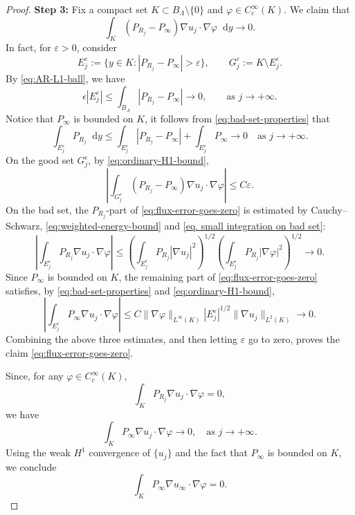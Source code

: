 \documentclass[12pt]{amsart}
\theoremstyle{plain}
\theoremstyle{definition}
\theoremstyle{remark}     %
\numberwithin{equation}{section}
\newcommand{\dd}{\mathop{}\!\mathrm{d}}%
\begin{document}
\begin{proof}
\noindent
{\bf Step 3:}
Fix a compact set
$K\subset B_\Lambda\setminus\{0\}$ and
$\varphi\in C_c^\infty(K)$.  We claim that
\begin{equation}\label{eq:flux-error-goes-zero}
    \int_K(P_{R_j}-P_\infty)
    \nabla u_j\cdot\nabla\varphi\dd y
    \to0.
\end{equation}
In fact, for $\varepsilon>0$, consider
\[
    E_j^\varepsilon
    :=\{y\in K:|P_{R_j}-P_\infty|>\varepsilon\},
    \qquad
    G_j^\varepsilon:=K\setminus E_j^\varepsilon.
\]
By \cref{eq:AR-L1-ball}, we have
\begin{equation}\label{eq:bad-set-properties}
    \epsilon|E_j^\varepsilon|
    \leq \int_{B_\Lambda }|P_{R_j}-P_{\infty}|
    \to0,
    \qquad
    \text{as }j\to+\infty.
\end{equation}
Notice that $P_\infty$ is bounded on $K$, it follows from \cref{eq:bad-set-properties} that
\begin{equation}\label{eq. small integration on bad set}
    \int_{E_j^\varepsilon}P_{R_j}\dd y
    \leq
    \int_{E_j^\varepsilon}|P_{R_j}-P_\infty|
    +\int_{E_j^\varepsilon}P_\infty
    \to0\quad
    \text{as }j\to+\infty.
\end{equation}
On the good set $G_j^\epsilon$, by \cref{eq:ordinary-H1-bound},
\[
\left|
\int_{G_j^\varepsilon}(P_{R_j}-P_\infty)
\nabla u_j\cdot\nabla\varphi
\right|
\leq C\varepsilon.
\]
On the bad set, the $P_{R_j}$-part of \cref{eq:flux-error-goes-zero} is estimated by Cauchy--Schwarz, \cref{eq:weighted-energy-bound} and \cref{eq. small integration on bad set}:
\[
\left|
\int_{E_j^\varepsilon}P_{R_j}
\nabla u_j\cdot\nabla\varphi
\right|
\leq
\left(\int_{E_j^\epsilon}P_{R_j}|\nabla u_j|^2\right)^{1/2}
\left(\int_{E_j^\varepsilon}
P_{R_j}|\nabla\varphi|^2\right)^{1/2}
\to0.
\]
Since $P_\infty$ is bounded on $K$, the remaining part of \cref{eq:flux-error-goes-zero} satisfies, by \cref{eq:bad-set-properties} and \cref{eq:ordinary-H1-bound},
\[
\left|
\int_{E_j^\varepsilon}P_\infty
\nabla u_j\cdot\nabla\varphi
\right|
\leq
C\|\nabla\varphi\|_{L^\infty(K)}
|E_j^\varepsilon|^{1/2}
\|\nabla u_j\|_{L^2(K)}
\to0.
\]
Combining the above three estimates, and then letting
$\varepsilon$ go to zero, proves the claim
\cref{eq:flux-error-goes-zero}.

Since, for any $\varphi\in C_c^\infty(K)$,
\[
    \int_{K} P_{R_j}\nabla u_j\cdot\nabla\varphi=0,
\]
we have
\[
    \int_{K} P_\infty\nabla u_j\cdot\nabla\varphi\to0,\quad 
    \text{as }j\to+\infty.
\]
Using the weak $H^1$ convergence of $\{u_j\}$ and the fact that $P_\infty$ is bounded
on $K$, we conclude
\begin{equation}\label{eq. punctured equation}
    \int_{K} P_\infty\nabla u_\infty\cdot\nabla\varphi=0.
\end{equation}


\end{proof}
\end{document}
